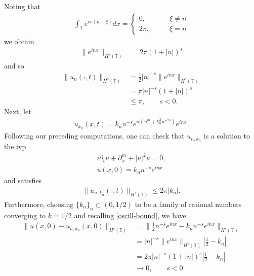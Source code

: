\documentclass[12pt,reqno]{amsart}
\numberwithin{equation}{section}  %
\numberwithin{figure}{section}
\newcommand{\ci}{\mathbb{T}}
\newcommand{\p}{\partial}
\theoremstyle{plain}
\theoremstyle{definition}
\theoremstyle{remark}
\begin{document}
%
%
Noting that
%
\begin{equation*}
	\begin{split}
		\int_{\ci}e^{ix(n - \xi)}dx =
		\begin{cases}0, \qquad & \xi \neq n 
			\\
			2 \pi, \qquad & \xi = n 
		\end{cases}
	\end{split}
\end{equation*}
%
%
we obtain
%
%
\begin{equation}
	\label{oscill-bound}
	\begin{split}
		\|e^{inx}\|_{H^{s}(\ci)} & = 2 \pi (1 + | n |)^{s}
	\end{split}
\end{equation}
%
%
and so
%
%
\begin{equation*}
	\begin{split}
		\|u_{n}(\cdot, t)\|_{H^s{(\ci)}}
    & = \frac{1}{2}|n|^{-s}\|e^{inx}\|_{H^{s}(\ci)}
    \\
    & = \pi |n|^{-s} (1 + | n |)^{s} 
    \\
    & \le \pi, \qquad s < 0.
	\end{split}
\end{equation*}
%
%
Next, let
%
%
\begin{equation*}
	\begin{split}
		u_{k_{n}}(x,t) = k_{n}n^{-s}e^{it\left( n^{m} + k_{n}^2 n^{-2s}
		\right)}e^{inx}.
	\end{split}
\end{equation*}
%
%
Following our preceding computations, one can check that $u_{n, k_{n}}$ is a solution to the ivp
%
%
\begin{equation}
	\label{family-ivp}
	\begin{split}
		i\p_t u + \p_x^{m} + | u |^{2}u = 0,
		\\
		u(x,0) = k_{n}n^{-s}e^{inx}
	\end{split}
\end{equation}
%
%
and satisfies 
%
%
\begin{equation*}
	\begin{split}
		\|u_{n, k_{n}}(\cdot, t)\|_{H^{s}(\ci)} \le 2 \pi |k_{n}|.
	\end{split}
\end{equation*}
%
%
Furthermore, choosing $\{k_{n}\}_{n} \subset (0, 1/2)$ to be a family of
rational numbers converging to $k =1/2$ and recalling \eqref{oscill-bound}, we
have
%
%
\begin{equation*}
	\begin{split}
		\|u(x,0) - u_{n, k_{n}}(x, 0) \|_{H^s(\ci)} 
		& =
		\|\frac{1}{2}n^{-s}e^{inx} - k_{n}n^{-s}e^{inx} \|_{H^s(\ci)}
		\\
		& = | n |^{-s} \|e^{inx}\|_{H^s(\ci)}|\frac{1}{2} - k_{n}|
		\\
    & = 2 \pi |n|^{-s}(1+| n |)^{s} |\frac{1}{2} - k_{n}|
    \\
    & \to 0, \qquad s < 0
	\end{split}
\end{equation*}
\end{document}
